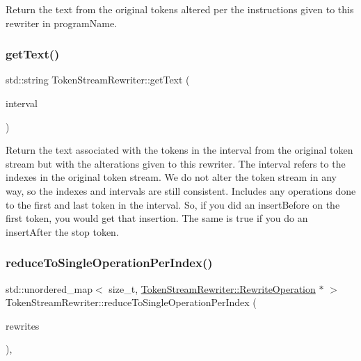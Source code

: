 Return the text from the original tokens altered per the instructions given to this rewriter in program\+Name. \mbox{\label{classantlr4_1_1TokenStreamRewriter_a384a88f75b99b2a2dc75dac00ea805fe}} 
\subsubsection{\texorpdfstring{get\+Text()}{getText()}\hspace{0.1cm}{\footnotesize\ttfamily [3/3]}}
{\footnotesize\ttfamily std\+::string Token\+Stream\+Rewriter\+::get\+Text (\begin{DoxyParamCaption}\item[{const \hyperlink{classantlr4_1_1misc_1_1Interval}{misc\+::\+Interval} \&}]{interval }\end{DoxyParamCaption})\hspace{0.3cm}{\ttfamily [virtual]}}

Return the text associated with the tokens in the interval from the original token stream but with the alterations given to this rewriter. The interval refers to the indexes in the original token stream. We do not alter the token stream in any way, so the indexes and intervals are still consistent. Includes any operations done to the first and last token in the interval. So, if you did an insert\+Before on the first token, you would get that insertion. The same is true if you do an insert\+After the stop token. \mbox{\label{classantlr4_1_1TokenStreamRewriter_a3c2c5242784157838416bd1ef18755cf}} 
\subsubsection{\texorpdfstring{reduce\+To\+Single\+Operation\+Per\+Index()}{reduceToSingleOperationPerIndex()}}
{\footnotesize\ttfamily std\+::unordered\+\_\+map$<$ size\+\_\+t, \hyperlink{classantlr4_1_1TokenStreamRewriter_1_1RewriteOperation}{Token\+Stream\+Rewriter\+::\+Rewrite\+Operation} $\ast$ $>$ Token\+Stream\+Rewriter\+::reduce\+To\+Single\+Operation\+Per\+Index (\begin{DoxyParamCaption}\item[{std\+::vector$<$ \hyperlink{classantlr4_1_1TokenStreamRewriter_1_1RewriteOperation}{Rewrite\+Operation} $\ast$$>$ \&}]{rewrites }\end{DoxyParamCaption})\hspace{0.3cm}{\ttfamily [protected]}, {\ttfamily [virtual]}}



